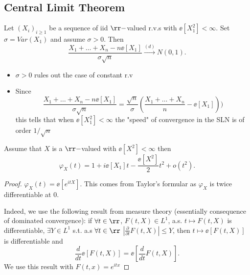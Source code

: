 \documentclass[../main.tex]{subfiles}
\begin{document}
\subsection{Central Limit Theorem}
\begin{theorem}
  Let $(X_i)_{i \geq 1}$ be a sequence of iid $\rr-$valued r.v.s with
  $\ee[X_1^2] < \infty$. Set $\sigma = Var(X_1)$ and assume $\sigma > 0$.
  Then
  \[
    \frac{X_1 + \ldots + X_n - n \ee[X_1]}{\sigma \sqrt{n}}
    \overset{(d)}{\longrightarrow} N(0, 1)
  .\] 
\end{theorem}
\begin{remark}
    \hfill
    \begin{itemize}
      \item $\sigma > 0$ rules out the case of constant r.v
      \item Since 
        \[
    \frac{X_1 + \ldots + X_n - n \ee[X_1]}{\sigma \sqrt{n}}
        = \frac{\sqrt{n}}{\sigma} \left( \frac{X_1 + \ldots + X_n}{n} - \ee[X_1] \right) )
        \] 
        this tells that when $\ee[X_1^2] < \infty$ the "speed" of convergence in
        the SLN is of order $1/\sqrt{n}$
    \end{itemize} 
\end{remark}
\begin{lemma}
  Assume that $X$ is a $\rr-$valued with $\ee[X^2] < \infty$ then
  \[
    \varphi_X(t) = 1 + i \ee[X_1]t - \frac{\ee[X^2]}{2} t^2 + o(t^2)
  .\] 
\end{lemma}
\begin{proof}
  $\varphi_X(t) = \ee[ e^{itX}] $. This comes from Taylor's formular as
  $\varphi_X$ is twice differentiable at $0$.

  Indeed, we use the following result from measure theory (essentially
  consequence of dominated convergence):
  if $\forall t \in \rr$, $F(t, X) \in L^1$, a.s. $t \mapsto F(t, X)$ is
  differentiable, $\exists Y \in L^1$ s.t. a.s $\forall t \in \rr$  $\left|
  \frac{\partial}{\partial t} F(t, X) \right| \leq Y$, then
  $t \mapsto \ee[F(t, X)]$ is differentiable and
  \[
    \frac{d}{dt} \ee[F(t, X)] = \ee[\frac{d}{dt} F(t, X)]
  .\] 
We use this result with $F(t, x) = e^{itx}$
\end{proof}
\end{document}

